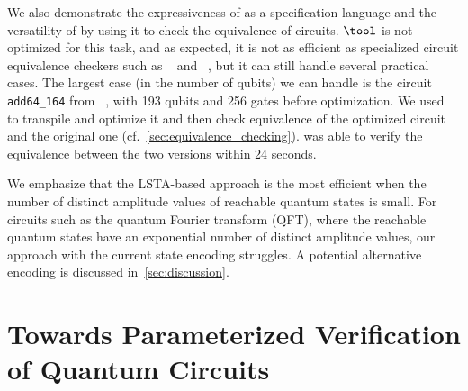 We also demonstrate the expressiveness of \lsta as a specification language and the versatility of \tool by using it to check the equivalence of circuits. 
$\tool$ is not optimized for this task, and as expected, it is not as efficient
as specialized circuit equivalence checkers such as \sliqec~\cite{ChenJH22,WeiTJJ22} and \qcec~\cite{burgholzer2020advanced}, but it
can still handle several practical cases. The largest case (in the number of
qubits) we can handle is the circuit \texttt{add64\_164} from
\revlibbench~\cite{WGT+:2008}, with 193 qubits and 256 gates before
optimization.
We used \qiskit~\cite{Qiskit} to transpile and optimize it and then
check equivalence of the optimized circuit and the original one
(cf.~\cref{sec:equivalence_checking}).
\tool was able to verify the equivalence between the two versions within 24 seconds. 

We emphasize that the LSTA-based approach is the most efficient when the number of distinct amplitude values of reachable quantum states is small. For circuits such as the quantum Fourier transform (QFT), where the reachable quantum states have an exponential number of distinct amplitude values, our approach with the current state encoding struggles. A potential alternative encoding is discussed in~\cref{sec:discussion}.


\vspace{-0.0mm}
\section{Towards Parameterized Verification of Quantum Circuits}\label{sec:paramterizedquantum}
\vspace{-0.0mm}

